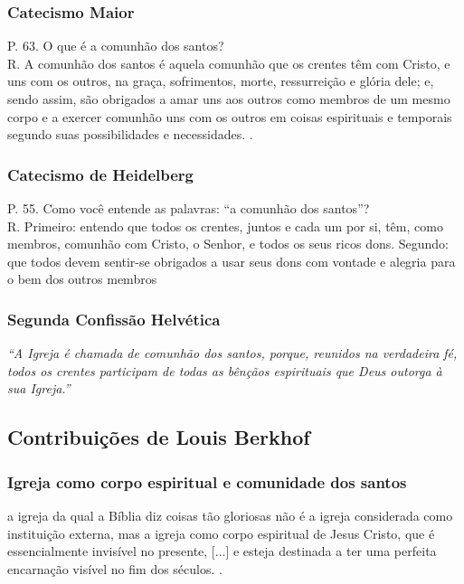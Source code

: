 \subsubsection{Catecismo Maior} 
\begin{citacao}
P. 63. O que é a comunhão dos santos?\\
R. A comunhão dos santos é aquela comunhão que os crentes têm com Cristo, e uns com os outros, na graça, sofrimentos, morte, ressurreição e glória dele; e, sendo assim, são obrigados a amar uns aos outros como membros de um mesmo corpo e a exercer comunhão uns com os outros em coisas espirituais e temporais segundo suas possibilidades e necessidades. \cite{catecismoMaior}.
\end{citacao}

\subsubsection{Catecismo de Heidelberg}
\begin{citacao}
P. 55. Como você entende as palavras: ``a comunhão dos santos''?\\
R. Primeiro: entendo que todos os crentes, juntos e cada um por si, têm, como membros, comunhão com Cristo, o Senhor, e todos os seus ricos dons. Segundo: que todos devem sentir-se obrigados a usar seus dons com vontade e alegria para o bem dos outros membros \cite{heidelberg}
\end{citacao}

\subsubsection{Segunda Confissão Helvética} 
\textit{``A Igreja é chamada de comunhão dos santos, porque, reunidos na verdadeira fé, todos os crentes participam de todas as bênçãos espirituais que Deus outorga à sua Igreja.''} \cite{helvetica}

\subsection{Contribuições de Louis Berkhof}

\subsubsection{Igreja como corpo espiritual e comunidade dos santos}
\begin{citacao}
    a igreja da qual a Bíblia diz coisas tão gloriosas não é a igreja considerada como instituição externa, mas a igreja como corpo espiritual de Jesus Cristo, que é essencialmente invisível no presente, [...] e esteja destinada a ter uma perfeita encarnação visível no fim dos séculos. \cite[p. 644]{berkhof2012}.
\end{citacao}

